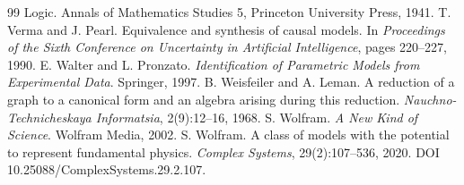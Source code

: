 \documentclass[11pt]{article}
\begin{document}
\begin{thebibliography}{99}
{Logic}. Annals of Mathematics Studies 5, Princeton University Press, 1941.
 T. Verma and J. Pearl. Equivalence and synthesis of causal models.
In \emph{Proceedings of the Sixth Conference on Uncertainty in Artificial
Intelligence}, pages 220--227, 1990.
 E. Walter and L. Pronzato. \emph{Identification of Parametric
Models from Experimental Data}. Springer, 1997.
 B. Weisfeiler and A. Leman. A reduction of a graph to a
canonical form and an algebra arising during this reduction.
\emph{Nauchno-Technicheskaya Informatsia}, 2(9):12--16, 1968.
 S. Wolfram. \emph{A New Kind of Science}. Wolfram Media, 2002.
 S. Wolfram. A class of models with the potential to represent
fundamental physics. \emph{Complex Systems}, 29(2):107--536, 2020. DOI 10.25088/ComplexSystems.29.2.107.
\end{thebibliography}
\end{document}
